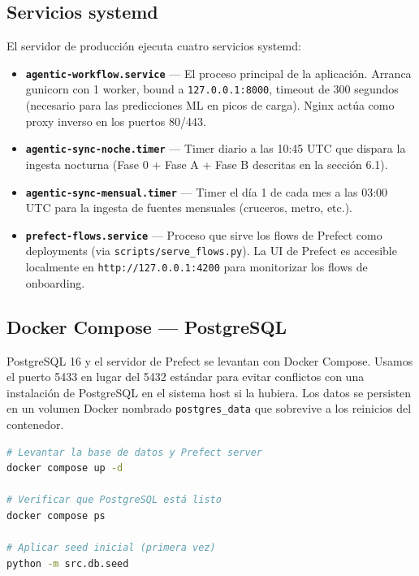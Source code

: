 \documentclass[12pt, a4paper]{article}
\begin{document}
\subsection{Servicios systemd}

El servidor de producción ejecuta cuatro servicios systemd:

\begin{itemize}
  \item \textbf{\texttt{agentic-workflow.service}} — El proceso principal de la aplicación. Arranca gunicorn con 1 worker, bound a \texttt{127.0.0.1:8000}, timeout de 300 segundos (necesario para las predicciones ML en picos de carga). Nginx actúa como proxy inverso en los puertos 80/443.

  \item \textbf{\texttt{agentic-sync-noche.timer}} — Timer diario a las 10:45 UTC que dispara la ingesta nocturna (Fase 0 + Fase A + Fase B descritas en la sección 6.1).

  \item \textbf{\texttt{agentic-sync-mensual.timer}} — Timer el día 1 de cada mes a las 03:00 UTC para la ingesta de fuentes mensuales (cruceros, metro, etc.).

  \item \textbf{\texttt{prefect-flows.service}} — Proceso que sirve los flows de Prefect como deployments (via \texttt{scripts/serve\_flows.py}). La UI de Prefect es accesible localmente en \texttt{http://127.0.0.1:4200} para monitorizar los flows de onboarding.
\end{itemize}

\subsection{Docker Compose — PostgreSQL}

PostgreSQL 16 y el servidor de Prefect se levantan con Docker Compose. Usamos el puerto 5433 en lugar del 5432 estándar para evitar conflictos con una instalación de PostgreSQL en el sistema host si la hubiera. Los datos se persisten en un volumen Docker nombrado \texttt{postgres\_data} que sobrevive a los reinicios del contenedor.

\begin{lstlisting}[language=bash]
# Levantar la base de datos y Prefect server
docker compose up -d

# Verificar que PostgreSQL está listo
docker compose ps

# Aplicar seed inicial (primera vez)
python -m src.db.seed
\end{lstlisting}
\end{document}
